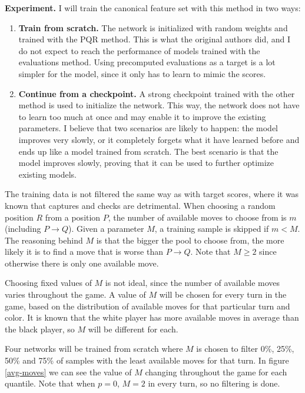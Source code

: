 \newpage
\textbf{Experiment.} I will train the canonical  feature set with this method in two ways:

\begin{enumerate}[label=\bf\Alph*.]
\item \textbf{Train from scratch.} The network is initialized with random weights and trained with the PQR method. This is what the original authors did, and I do not expect to reach the performance of models trained with the evaluations method. Using precomputed evaluations as a target is a lot simpler for the model, since it only has to learn to mimic the scores.

\item \textbf{Continue from a checkpoint.} A strong checkpoint trained with the other method is used to initialize the network. This way, the network does not have to learn too much at once and may enable it to improve the existing parameters. I believe that two scenarios are likely to happen: the model improves very slowly, or it completely forgets what it have learned before and ends up like a model trained from scratch. The best scenario is that the model improves slowly, proving that it can be used to further optimize existing models.
\end{enumerate}

The training data is not filtered the same way as with target scores, where it was known that captures and checks are detrimental. When choosing a random position $R$ from a position $P$, the number of available moves to choose from is $m$ (including $P \rightarrow Q$). Given a parameter $M$, a training sample is skipped if $m < M$. The reasoning behind $M$ is that the bigger the pool to choose from, the more likely it is to find a move that is worse than $P \rightarrow Q$. Note that $M \geq 2$ since otherwise there is only one available move.

Choosing fixed values of $M$ is not ideal, since the number of available moves varies throughout the game. A value of $M$ will be chosen for every turn in the game, based on the distribution of available moves for that particular turn and color. It is known that the white player has more available moves in average than the black player, so $M$ will be different for each.

Four networks will be trained from scratch where $M$ is chosen to filter 0\%, 25\%, 50\% and 75\% of samples with the least available moves for that turn. In figure \ref{avg-moves} we can see the value of $M$ changing throughout the game for each quantile. Note that when $p=0$, $M=2$ in every turn, so no filtering is done. \\

